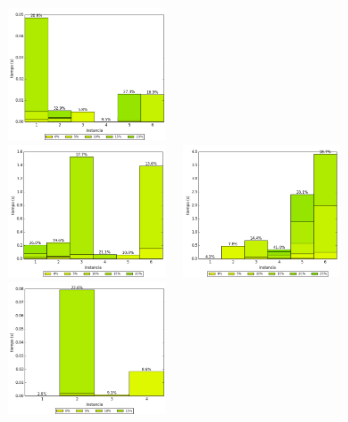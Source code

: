 \begin{columns}[t]
\centering
\includegraphics[width=4.5cm,height=3.5cm]{./evaluacion_experimental/mejoras_greedy_alio/greedy_costo_Chicas}\\
\includegraphics[width=4.5cm,height=3.5cm]{./evaluacion_experimental/mejoras_greedy_alio/greedy_costo_Medianas}
\centering
\includegraphics[width=4.5cm,height=3.5cm]{./evaluacion_experimental/mejoras_greedy_alio/greedy_costo_Grandes}\\
\includegraphics[width=4.5cm,height=3.5cm]{./evaluacion_experimental/mejoras_greedy_alio/greedy_costo_Montevideo}
\end{columns}